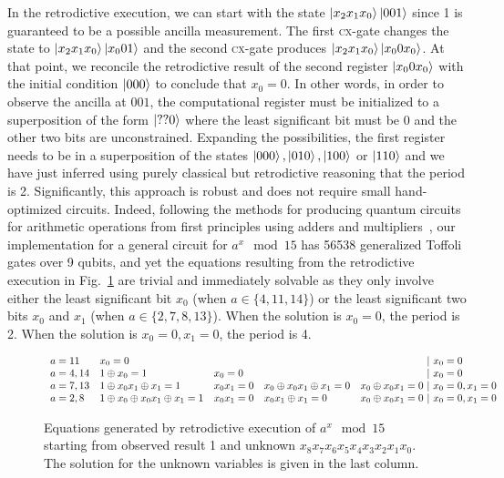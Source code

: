 \documentclass{article}
\newcommand{\cx}{\textsc{cx}}
\begin{document}
\begin{refsection}
In the retrodictive execution, we can start with the state
$\ket{x_2x_1x_0}\ket{001}$ since 1 is guaranteed to be a possible
ancilla measurement. The first \cx-gate changes the state to
$\ket{x_2x_1x_0}\ket{x_001}$ and the second \cx-gate produces
$\ket{x_2x_1x_0}\ket{x_00x_0}$. At that point, we reconcile the
retrodictive result of the second register $\ket{x_00x_0}$ with the
initial condition $\ket{000}$ to conclude that $x_0=0$. In other
words, in order to observe the ancilla at $001$, the computational
register must be initialized to a superposition of the form
$\ket{??0}$ where the least significant bit must be 0 and the other
two bits are unconstrained. Expanding the possibilities, the first
register needs to be in a superposition of the states $\ket{000},
\ket{010}, \ket{100}$ or $\ket{110}$ and we have just inferred using
purely classical but retrodictive reasoning that the period is
2. Significantly, this approach is robust and does not require small
hand-optimized circuits. Indeed, following the methods for producing
quantum circuits for arithmetic operations from first principles using
adders and multipliers~\cite{PhysRevA.54.147}, our implementation for
a general circuit for $a^x \mod{15}$ has 56538 generalized Toffoli
gates over 9 qubits, and yet the equations resulting from the
retrodictive execution in Fig.~\ref{fig:shor-eqs} are trivial and
immediately solvable as they only involve either the least significant
bit $x_0$ (when $a \in \{4,11,14\}$) or the least significant two bits
$x_0$ and $x_1$ (when $a \in \{2,7,8,13\}$). When the solution is
$x_0=0$, the period is 2. When the solution is $x_0=0,x_1=0$, the
period is 4.

\begin{figure}
\[\begin{array}{l@{\quad}llll@{~|~}l}
a=11 & x_0 = 0 &&&& x_0 = 0 \\
a=4,14 & 1 \oplus x_0 = 1 & x_0 = 0 &&
  & x_0 = 0 \\
a=7,13 & 1 \oplus x_0x_1 \oplus x_1 = 1 & x_0x_1 = 0 & x_0 \oplus x_0x_1 \oplus x_1 = 0 &  x_0 \oplus x_0x_1 = 0 & x_0=0, x_1=0 \\
a=2,8 & 1 \oplus x_0 \oplus x_0x_1 \oplus x_1 = 1 & x_0x_1 = 0 & x_0x_1 \oplus x_1 = 0 & x_0 \oplus x_0x_1 = 0  & x_0=0,x_1=0
\end{array}\]
\caption{\label{fig:shor-eqs}Equations generated by retrodictive
  execution of $a^x \mod{15}$ starting from observed result 1 and
  unknown $x_8x_7x_6x_5x_4x_3x_2x_1x_0$. The solution for the unknown
  variables is given in the last column.}
\end{figure}


\end{refsection}
\end{document}
